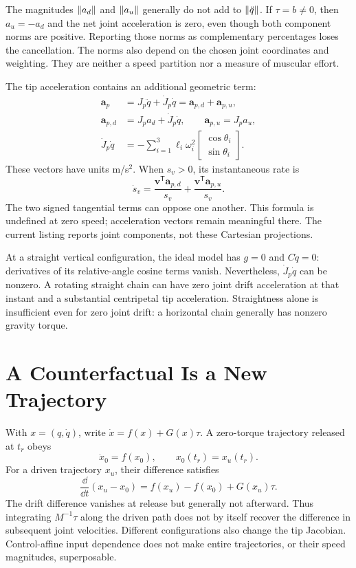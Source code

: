 \begin{warningbox}
The magnitudes $\left\lVert a_d \right\rVert$ and $\left\lVert a_u \right\rVert$ generally do not add to
$\left\lVert \ddot q \right\rVert$. If $\tau=b\ne0$, then $a_u=-a_d$ and the net joint
acceleration is zero, even though both component norms are positive. Reporting
those norms as complementary percentages loses the cancellation. The norms also
depend on the chosen joint coordinates and weighting. They are neither a speed
partition nor a measure of muscular effort.
\end{warningbox}

The tip acceleration contains an additional geometric term:
\begin{align}
 \bm a_p&=J_p\ddot q+\dot J_p\dot q=\bm a_{p,d}+\bm a_{p,u},\\
 \bm a_{p,d}&=J_pa_d+\dot J_p\dot q,\qquad
 \bm a_{p,u}=J_pa_u,\\
 \dot J_p\dot q&=-\sum_{i=1}^{3}\ell_i\omega_i^2
   \begin{bmatrix}\cos\theta_i\\\sin\theta_i\end{bmatrix}.
\end{align}
These vectors have units m/s$^2$. When $s_v>0$, its instantaneous rate is
\begin{equation}
 \dot s_v=\frac{\bm v^{\mathsf T}\bm a_{p,d}}{s_v}
          +\frac{\bm v^{\mathsf T}\bm a_{p,u}}{s_v}.
\end{equation}
The two signed tangential terms can oppose one another. This formula is
undefined at zero speed; acceleration vectors remain meaningful there.
The current listing reports joint components, not these Cartesian projections.

At a straight vertical configuration, the ideal model has $g=0$ and
$C\dot q=0$: derivatives of its relative-angle cosine terms vanish.
Nevertheless, $\dot J_p\dot q$ can be nonzero. A rotating straight chain can
have zero joint drift acceleration at that instant and a substantial centripetal
tip acceleration. Straightness alone is insufficient even for zero joint drift:
a horizontal chain generally has nonzero gravity torque.

\section{A Counterfactual Is a New Trajectory}

With $x=(q,\dot q)$, write $\dot x=f(x)+G(x)\tau$. A zero-torque trajectory
released at $t_r$ obeys
\begin{equation}
 \dot x_0=f(x_0),\qquad x_0(t_r)=x_u(t_r).
\end{equation}
For a driven trajectory $x_u$, their difference satisfies
\begin{equation}
 \frac{\dd}{\dd t}(x_u-x_0)
 =f(x_u)-f(x_0)+G(x_u)\tau.
\end{equation}
The drift difference vanishes at release but generally not afterward. Thus
integrating $M^{-1}\tau$ along the driven path does not by itself recover the
difference in subsequent joint velocities. Different configurations also change
the tip Jacobian. Control-affine input dependence does not make entire
trajectories, or their speed magnitudes, superposable.

